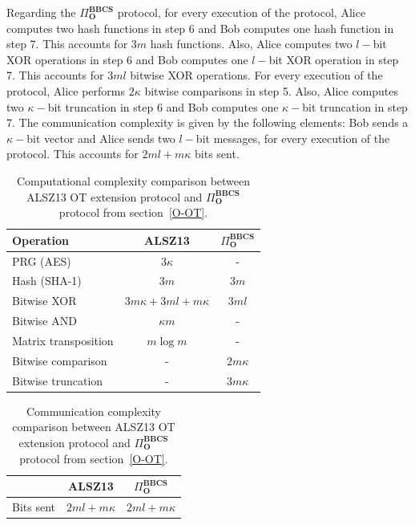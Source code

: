 Regarding the $\Pi^{\textbf{BBCS}}_{\textbf{O}}$ protocol, for every execution of the protocol, Alice computes two hash functions in step 6 and Bob computes one hash function in step 7. This accounts for $3m$ hash functions. Also, Alice computes two $l-$bit XOR operations in step 6 and Bob computes one $l-$bit XOR operation in step 7. This accounts for $3ml$ bitwise XOR operations. For every execution of the protocol, Alice performs $2\kappa$ bitwise comparisons in step 5. Also, Alice computes two $\kappa-$bit truncation in step 6 and Bob computes one $\kappa-$bit truncation in step 7. The communication complexity is given by the following elements: Bob sends a $\kappa-$bit vector and Alice sends two $l-$bit messages, for every execution of the protocol. This accounts for $2ml + m\kappa$ bits sent.

\begin{table}[h!]
\centering
\begin{tabular}{lcc}
\toprule
Operation & ALSZ13 & $\Pi^{\textbf{BBCS}}_{\textbf{O}}$ \\
\midrule
PRG (AES)     & $3\kappa$              & -\\ 
Hash (SHA-1)    & $3m$              & $3m$ \\ 
Bitwise XOR      & $3 m \kappa + 3ml + m\kappa$             & $3ml$  \\ 
Bitwise AND  & $\kappa m$              & -           \\
Matrix transposition & $m\log m$              & -           \\
Bitwise comparison & -             & $2m\kappa$           \\
Bitwise truncation & -            & $3m\kappa$           \\
\bottomrule
\end{tabular}
\caption{Computational complexity comparison between ALSZ13 \cite{ALSZ13} OT extension protocol and $\Pi^{\textbf{BBCS}}_{\textbf{O}}$ protocol from section~\ref{O-OT}.}
\label{table:CvsQ_OT_comparison_computation}
\end{table}

\begin{table}[h!]
\centering
\begin{tabular}{lcc}
\toprule
 & ALSZ13 & $\Pi^{\textbf{BBCS}}_{\textbf{O}}$  \\
\midrule
\multicolumn{1}{l}{Bits sent }   & $2ml  + m\kappa$   & $2ml + m\kappa $  \\
\bottomrule
\end{tabular}
\caption{Communication complexity comparison between ALSZ13 \cite{ALSZ13} OT extension protocol and $\Pi^{\textbf{BBCS}}_{\textbf{O}}$ protocol from section~\ref{O-OT}.}
\label{table:CvsQ_OT_comparison_communication}
\end{table}

